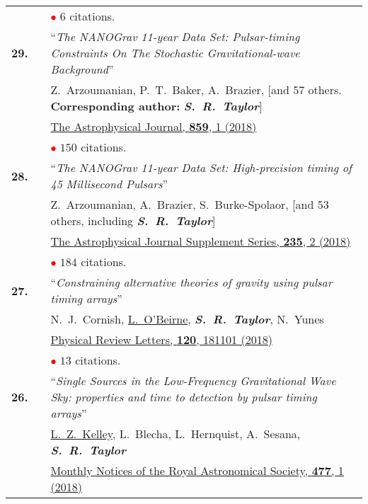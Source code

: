 \documentclass[11pt,letterpaper,sans]{moderncv}
\begin{document}
{\begin{longtable}{rp{0.3cm}p{15.8cm}}
&& \textcolor{red}{$\bullet$} $6$ citations. \vspace{0.09cm}\\
\textbf{29.} & & ``\textit{The NANOGrav 11-year Data Set: Pulsar-timing Constraints On The Stochastic Gravitational-wave Background}'' \\ 
&&Z.~Arzoumanian, P.~T.~Baker, A.~Brazier, [and 57 others. \textbf{Corresponding author:} \textit{\textbf{S.~R.~Taylor}}]\\
&& \href{http://iopscience.iop.org/article/10.3847/1538-4357/aabd3b/meta}{{\color{color1} The Astrophysical Journal, \textbf{859}, 1 (2018)}}  \\
&& \textcolor{red}{$\bullet$} $150$ citations. \vspace{0.09cm}\\
\textbf{28.} & & ``\textit{The NANOGrav 11-year Data Set: High-precision timing of 45 Millisecond Pulsars}'' \\ 
&&Z.~Arzoumanian, A.~Brazier, S.~Burke-Spolaor, [and 53 others, including \textit{\textbf{S.~R.~Taylor}}]\\
&& \href{http://iopscience.iop.org/article/10.3847/1538-4365/aab5b0/meta}{{\color{color1} The Astrophysical Journal Supplement Series, \textbf{235}, 2 (2018)}}  \\
&& \textcolor{red}{$\bullet$} $184$ citations. \vspace{0.09cm}\\
\textbf{27.} & & ``\textit{Constraining alternative theories of gravity using pulsar timing arrays}'' \\ 
&&N.~J.~Cornish, \underline{L.~O'Beirne}, \textit{\textbf{S.~R.~Taylor}}, N.~Yunes\\
&& \href{https://journals.aps.org/prl/abstract/10.1103/PhysRevLett.120.181101}{{\color{color1} Physical Review Letters, \textbf{120}, 181101 (2018)}}  \\
&& \textcolor{red}{$\bullet$} $13$ citations. \vspace{0.09cm}\\
\textbf{26.} & & ``\textit{Single Sources in the Low-Frequency Gravitational Wave Sky: properties and time to detection by pulsar timing arrays}'' \\ 
&&\underline{L.~Z.~Kelley}, L.~Blecha, L.~Hernquist, A.~Sesana, \textit{\textbf{S.~R.~Taylor}} \\
&& \href{https://academic.oup.com/mnras/article-abstract/477/1/964/4937809?redirectedFrom=fulltext}{{\color{color1} Monthly Notices of the Royal Astronomical Society, \textbf{477}, 1 (2018)}}  \\

\end{longtable}}
\end{document}
